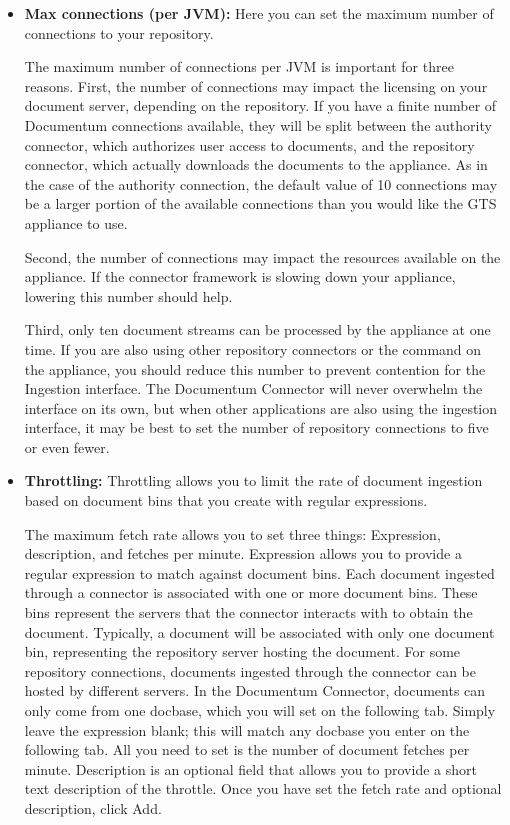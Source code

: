 \begin{itemize}

\item \textbf{Max connections (per JVM):} \ifCombinedConnectorGuide \label{maxrepocon} \fi Here you can set the maximum
number of connections to your repository.

The maximum number of connections per JVM is important for three
reasons.  First, the number of connections may impact the licensing on
your document server, depending on the repository. If you have a
finite number of Documentum connections available, they will be split
between the authority connector, which authorizes user access to
documents, and the repository connector, which actually downloads the
documents to the appliance. As in the case of the authority
connection, the default value of 10 connections may be a larger
portion of the available connections than you would like the GTS
appliance to use.

Second, the number of connections may impact the resources
available on the appliance. If the connector framework is slowing down
your appliance, lowering this number should help.

Third, only ten document streams can be processed by the appliance at
one time.  If you are also using other repository connectors or the
 command on the appliance, you should reduce this
number to prevent contention for the Ingestion interface. The
Documentum Connector will never overwhelm the interface on its own,
but when other applications are also using the ingestion interface, it
may be best to set the number of repository connections to five or
even fewer.

\item \textbf{Throttling:} Throttling allows you to limit the rate of
document ingestion based on document bins that you create with regular
expressions.

The maximum fetch rate allows you to set three things: Expression,
description, and fetches per minute. Expression allows you to provide
a regular expression to match against document bins. Each document
ingested through a connector is associated with one or more document
bins. These bins represent the servers that the connector interacts
with to obtain the document. Typically, a document will be associated
with only one document bin, representing the repository server hosting
the document. For some repository connections, documents ingested
through the connector can be hosted by different servers. In the
Documentum Connector, documents can only come from one docbase, which
you will set on the following tab. Simply leave the expression blank;
this will match any docbase you enter on the following tab.  All you
need to set is the number of document fetches per minute.  Description
is an optional field that allows you to provide a short text
description of the throttle.  Once you have set the fetch rate and
optional description, click Add.

\end{itemize}

